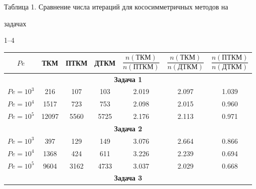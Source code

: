 \begin{center} 


Таблица 1. Сравнение числа итераций для кососимметричных методов на 


задачах


1--4


\medskip


 


\begin{tabular}{|c|c|c|c|c|c|c|} 


\hline 


$Pe$ & ТКМ & ПТКМ & ДТКМ & $\dfrac{n(\text{ТКМ})}{n(\text{ПТКМ})}$ 


& $\dfrac{n(\text{ТКМ})}{n(\text{ДТКМ})}$ & 


$\dfrac{n(\text{ПТКМ})}{n(\text{ДТКМ})}$ \\


\hline 


\multicolumn{7}{|c|}{\bf Задача 1} \\ 


\hline


$Pe=10^3$ & 216 & 107 & 103 & 2.019 & 2.097 & 1.039 \\ 


\hline 


$Pe=10^4$ & 1517 & 723 & 753 & 2.098 & 2.015 & 0.960 \\ 


\hline 


$Pe=10^5$ & 12097 & 5560 & 5725 & 2.176 & 2.113 & 0.971 \\ 


\hline 


\multicolumn{7}{|c|}{\bf Задача 2}\\ 


\hline 


$Pe=10^3$ & 397 & 129 & 149 & 3.076 & 2.664 & 0.866 \\ 


\hline 


$Pe=10^4$ & 1368 & 424 & 611 & 3.226 & 2.239 & 0.694 \\ 


\hline 


$Pe=10^5$ & 9604 & 3162 & 4733 & 3.037 & 2.029 & 0.668 \\ 


\hline 


\multicolumn{7}{|c|}{\bf Задача 3} \\ 


\hline 



\end{tabular}
\end{center}

